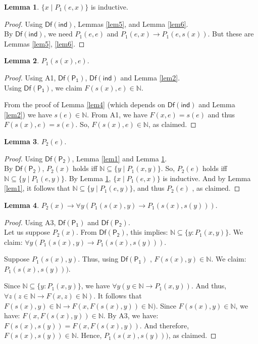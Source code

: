 \documentclass[11pt,a4paper]{article}
\newcommand{\N}{ \ensuremath{ \mathbb{N}}}
\theoremstyle{definition}
\newtheorem{lem}{Lemma}
\begin{document}
\begin{lem}\label{lem7} $\{x \mid P_1(e, x)\}$ is inductive.\end{lem}
\begin{proof} Using $\mathsf{Df(ind)}$, Lemmas \ref{lem5}, and Lemma \ref{lem6}.\\
By $\mathsf{Df(ind)}$, we need $P_1(e, e)$ and $P_1(e, x) \to P_1(e, s(x))$. But these are Lemmas \ref{lem5}, \ref{lem6}.
\end{proof}

\begin{lem}\label{lem8} $P_1(s(x), e)$.\end{lem}
\begin{proof} Using A1, $\mathsf{Df(P_1)}$, $\mathsf{Df(ind)}$ and Lemma \ref{lem2}.\\
Using $\mathsf{Df(P_1)}$, we claim $F(s(x), e) \in \N$.

From the proof of Lemma \ref{lem4} (which depends on $\mathsf{Df(ind)}$ and Lemma \ref{lem2}) we have $s(e) \in \N$. From A1, we have $F(x, e) = s(e)$ and thus $F(s(x), e) = s(e)$. So, $F(s(x), e) \in \N$, as claimed.
\end{proof}

\begin{lem}\label{lem9} $P_2(e)$.\end{lem}
\begin{proof} Using $\mathsf{Df(P_2)}$, Lemma \ref{lem1} and Lemma \ref{lem7}.\\
 By $\mathsf{Df(P_2)}$, $P_2(x)$ holds iff $\N \subseteq \{ y \mid P_1(x,y) \}$. So, $P_2(e)$ holds iff $\N \subseteq \{ y \mid P_1(e,y) \}$. By Lemma \ref{lem7}, $\{x \mid P_1(e, x)\}$ is inductive. And by Lemma \ref{lem1}, it follows that $\N \subseteq \{ y \mid P_1(e,y) \}$, and thus $P_2(e)$ , as claimed.\end{proof}

\begin{lem}\label{lem10} $P_2(x) \to \forall y (P_1(s(x), y) \to P_1(s(x), s(y)))$.\end{lem}
\begin{proof} Using A3, $\mathsf{Df(P_1)}$ and $\mathsf{Df(P_2)}$.\\
Let us suppose $P_2(x)$. From $\mathsf{Df(P_2)}$, this implies: $\N \subseteq \{y : P_1(x, y)\}$. We claim: $
\forall y (P_1(s(x), y) \to P_1(s(x), s(y)))$. 

Suppose $P_1(s(x), y)$. Thus, using $\mathsf{Df(P_1)}$ , $F(s(x), y) \in \N$. We claim: $P_1(s(x), s(y)))$.

Since $\N \subseteq \{y : P_1(x, y)\}$, we have $\forall y (y \in \N \to P_1(x, y))$. And thus, $\forall z (z \in \N \to F(x, z) \in \N)$. It follows that $F(s(x), y) \in \N \to F(x, F(s(x), y)) \in \N)$. Since $F(s(x), y) \in \N$, we have: $
F(x, F(s(x), y)) \in \N$. By A3, we have: $F(s(x), s(y)) = F(x, F(s(x), y))$. And therefore, $F(s(x), s(y)) \in \N$. Hence, $P_1(s(x), s(y)))$, as claimed.
\end{proof}
\end{document}
